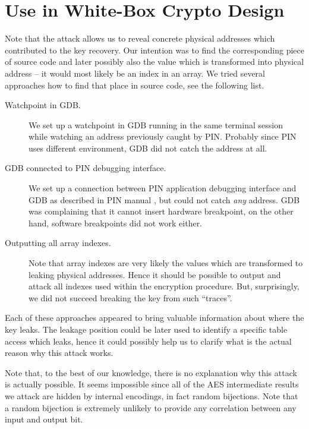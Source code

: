 \section{Use in White-Box Crypto Design}

Note that the attack allows us to reveal concrete physical addresses which contributed to the key recovery. Our intention was to find the corresponding piece of source code and later possibly also the value which is transformed into physical address -- it would most likely be an index in an array. We tried several approaches how to find that place in source code, see the following list.

\begin{description}
	\item[Watchpoint in GDB.]
		We set up a watchpoint in GDB running in the same terminal session while watching an address previously caught by PIN. Probably since PIN uses different environment, GDB did not catch the address at all.
	\item[GDB connected to PIN debugging interface.]
		We set up a connection between PIN application debugging interface and GDB as described in PIN manual \cite{pin214manual}, but could not catch {\em any} address. GDB was complaining that it cannot insert hardware breakpoint, on the other hand, software breakpoints did not work either.
	\item[Outputting all array indexes.]
		Note that array indexes are very likely the values which are transformed to leaking physical addresses. Hence it should be possible to output and attack all indexes used within the encryption procedure. But, surprisingly, we did not succeed breaking the key from such ``traces''.
\end{description}

Each of these approaches appeared to bring valuable information about where the key leaks. The leakage position could be later used to identify a specific table access which leaks, hence it could possibly help us to clarify what is the actual reason why this attack works.

Note that, to the best of our knowledge, there is no explanation why this attack is actually possible. It seems impossible since all of the AES intermediate results we attack are hidden by internal encodings, in fact random bijections. Note that a random bijection is extremely unlikely to provide any correlation between any input and output bit.

